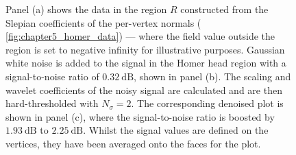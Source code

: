 \begin{figure}[htpb]
    \centering\capstart{}
    \hfill
    \hfill
    \caption[
        A denoising demonstration for a field on the Homer mesh
    ]{
        Panel (a) shows the data in the region \(R\) constructed from the Slepian coefficients of the per-vertex normals (\cf{} \cref{fig:chapter5_homer_data}) --- where the field value outside the region is set to negative infinity for illustrative purposes.
        Gaussian white noise is added to the signal in the Homer head region with a signal-to-noise ratio of \(\SI{0.32}{\dB}\), shown in panel (b).
        The scaling and wavelet coefficients of the noisy signal are calculated and are then hard-thresholded with \(N_{\sigma}=2\).
        The corresponding denoised plot is shown in panel (c), where the signal-to-noise ratio is boosted by \(\SI{1.93}{\dB}\) to \(\SI{2.25}{\dB}\).
        Whilst the signal values are defined on the vertices, they have been averaged onto the faces for the plot.
    }\label{fig:chapter5_denoising}
\end{figure}
